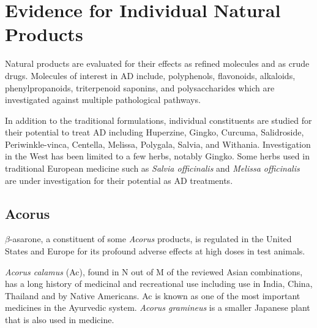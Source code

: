 %
%

\section{Evidence for Individual Natural Products}


Natural products are evaluated for their effects
as refined molecules and
as crude drugs.
Molecules of interest in AD include,
polyphenols,
flavonoids,
alkaloids,
phenylpropanoids,
triterpenoid saponins,
and polysaccharides
which are investigated
against multiple pathological pathways.
\cite{
darvesh2010oxidative,
gao2013research}

In addition to the traditional formulations,
individual constituents are studied for their potential
to treat AD including
Huperzine,
Gingko,
Curcuma,
Salidroside,
Periwinkle-vinca,
Centella,
Melissa,
Polygala,
Salvia,
and Withania.
\cite{sun2013traditional}
Investigation in the West has been limited to a few herbs,
notably Gingko. Some herbs used in traditional European medicine
such as \textit{Salvia officinalis} and \textit{Melissa officinalis}
are under investigation for their potential as AD treatments.
\cite{perry1999medicinal}


\subsection{Acorus}

$\beta$-asarone, a constituent of some
\textit{Acorus} products,
is regulated in the United States and Europe
for its profound adverse effects
at high doses in test animals.
\cite{EC2002directorate}

\textit{Acorus calamus} (Ac),
found in N out of M of the reviewed Asian combinations,
has a long history of medicinal and recreational use
including use in India, China, Thailand and by Native Americans.
\cite{phongpaichit2005antimicrobial}
Ac is known as one of the most important medicines in
the Ayurvedic system.
\cite{kumar2013medicinal}
\textit{Acorus gramineus} is a smaller Japanese plant
that is also used in medicine.

